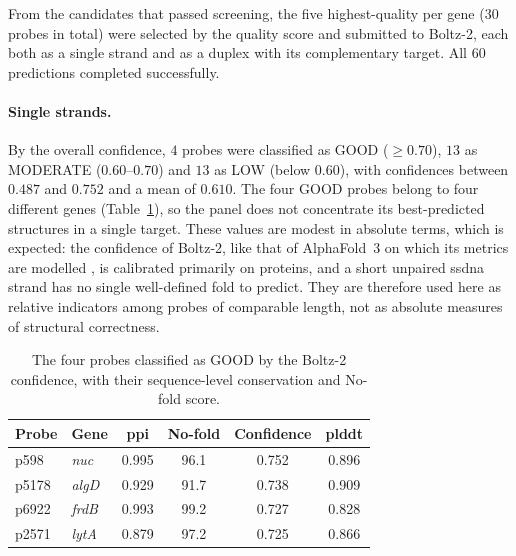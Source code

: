 From the candidates that passed screening, the five highest-quality per gene ($30$ probes in total)
were selected by the quality score and submitted to Boltz-2, each both as a single strand and as a
duplex with its complementary target. All $60$ predictions completed successfully.

\paragraph{Single strands.} By the overall confidence, $4$ probes were classified as GOOD
($\geq 0.70$), $13$ as MODERATE ($0.60$--$0.70$) and $13$ as LOW (below $0.60$),
with confidences between $0.487$ and $0.752$ and a mean of $0.610$. The four GOOD probes
belong to four different genes (Table~\ref{tab:boltz}), so the panel does not concentrate its
best-predicted structures in a single target. These values are modest in absolute terms, which is
expected: the confidence of Boltz-2, like that of AlphaFold~3 on which its metrics are modelled
\citep{abramson2024,wohlwend2024}, is calibrated primarily on proteins, and a short unpaired
\acrshort{ssdna} strand has no single well-defined fold to predict. They are therefore used here as
relative indicators among probes of comparable length, not as absolute measures of structural
correctness.

\begin{table}[H]
\begin{center}
\begin{tabular}{l l c c c c}
\hline
\textbf{Probe} & \textbf{Gene} & \textbf{\acrshort{ppi}} & \textbf{No-fold} & \textbf{Confidence} & \textbf{\acrshort{plddt}} \\
\hline
p598 & \emph{nuc} & 0.995 & 96.1 & 0.752 & 0.896 \\
p5178 & \emph{algD} & 0.929 & 91.7 & 0.738 & 0.909 \\
p6922 & \emph{frdB} & 0.993 & 99.2 & 0.727 & 0.828 \\
p2571 & \emph{lytA} & 0.879 & 97.2 & 0.725 & 0.866 \\
\hline
\end{tabular}
\end{center}
\caption{The four probes classified as GOOD by the Boltz-2 confidence, with their
sequence-level conservation and No-fold score.}
\label{tab:boltz}
\end{table}

